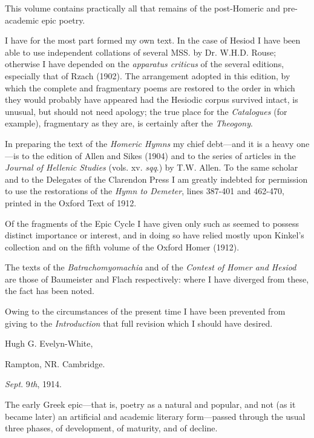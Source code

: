 
This volume contains practically all that remains of the post-Homeric and
pre-academic epic poetry.

I have for the most part formed my own text. In the case of Hesiod I have been
able to use independent collations of several MSS. by Dr. W.H.D. Rouse;
otherwise I have depended on the \emph{apparatus criticus} of the several
editions, especially that of Rzach (1902). The arrangement adopted in this
edition, by which the complete and fragmentary poems are restored to the order
in which they would probably have appeared had the Hesiodic corpus survived
intact, is unusual, but should not need apology; the true place for the
\emph{Catalogues} (for example), fragmentary as they are, is certainly after
the \emph{Theogony}.

In preparing the text of the \emph{Homeric Hymns} my chief debt—and it is
a heavy one—is to the edition of Allen and Sikes (1904) and to the series
of articles in the \emph{Journal of Hellenic Studies} (vols. xv. \emph{sqq}.)
by T.W. Allen. To the same scholar and to the Delegates of the Clarendon Press
I am greatly indebted for permission to use the restorations of the \emph{Hymn to
Demeter}, lines 387-401 and 462-470, printed in the Oxford Text of 1912.

Of the fragments of the Epic Cycle I have given only such as seemed to possess
distinct importance or interest, and in doing so have relied mostly upon
Kinkel’s collection and on the fifth volume of the Oxford Homer (1912).

The texts of the \emph{Batrachomyomachia} and of the \emph{Contest of Homer and
Hesiod} are those of Baumeister and Flach respectively: where I have
diverged from these, the fact has been noted.

Owing to the circumstances of the present time I have been prevented from
giving to the \emph{Introduction} that full revision which I should have
desired.

Hugh G. Evelyn-White,

Rampton, NR. Cambridge.

\emph{Sept}. 9\emph{th}, 1914.



The early Greek epic—that is, poetry as a natural and popular, and not
(as it became later) an artificial and academic literary form—passed
through the usual three phases, of development, of maturity, and of decline.

